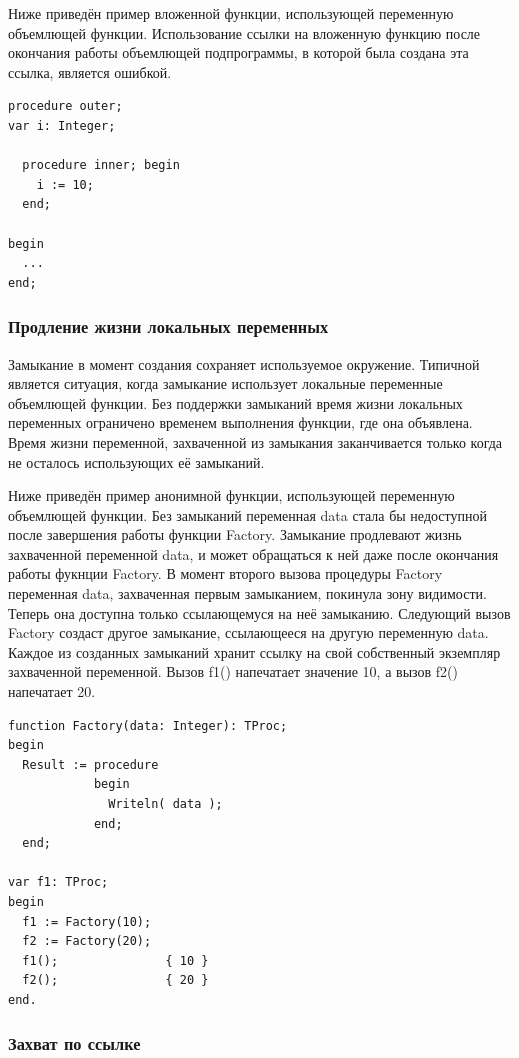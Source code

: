 \documentclass{imcs}
\begin{document}
Ниже приведён пример вложенной функции, использующей переменную объемлющей функции.
Использование ссылки на вложенную функцию после окончания работы объемлющей подпрограммы,
в которой была создана эта ссылка, является ошибкой.
\begin{lstlisting}    
procedure outer;
var i: Integer;

  procedure inner; begin
    i := 10;
  end;

begin
  ...
end;    
\end{lstlisting}

\subsubsection{Продление жизни локальных переменных}

Замыкание в момент создания сохраняет используемое окружение.
Типичной является ситуация, когда замыкание использует локальные переменные
объемлющей функции. Без поддержки замыканий время жизни локальных
переменных ограничено временем выполнения функции, где она объявлена.
Время жизни переменной, захваченной из замыкания заканчивается только
когда не осталось использующих её замыканий.

Ниже приведён пример анонимной функции, использующей переменную объемлющей функции.
Без замыканий переменная data стала бы недоступной после завершения
работы функции Factory. Замыкание продлевают жизнь захваченной переменной data, и может
обращаться к ней даже после окончания работы фукнции Factory. В момент второго
вызова процедуры Factory переменная data, захваченная первым замыканием, покинула зону видимости. 
Теперь она доступна только ссылающемуся на неё замыканию. Следующий вызов Factory создаст
другое замыкание, ссылающееся на другую переменную data.
Каждое из созданных замыканий хранит ссылку на свой собственный
экземпляр захваченной переменной. Вызов f1() напечатает значение 10, а вызов f2()
напечатает 20.
\begin{lstlisting}
function Factory(data: Integer): TProc;
begin
  Result := procedure
            begin
              Writeln( data );
            end;
  end;
    
var f1: TProc;
begin
  f1 := Factory(10);
  f2 := Factory(20);
  f1();               { 10 }
  f2();               { 20 }
end.
\end{lstlisting}    

\subsubsection{Захват по ссылке}
\end{document}
